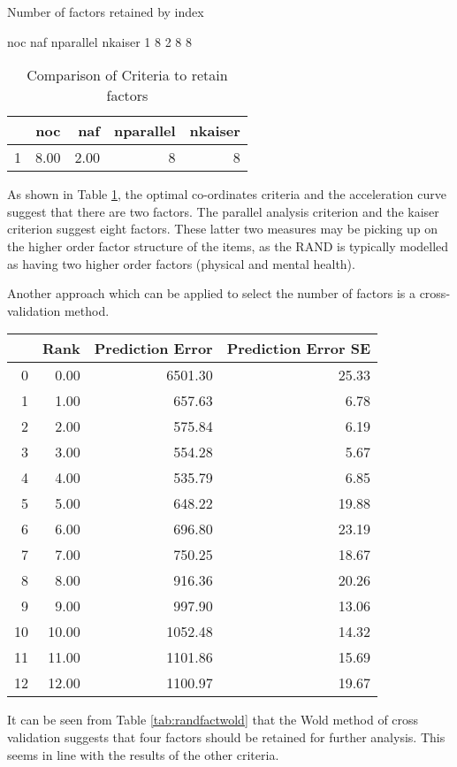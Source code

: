 \documentclass{article}
\begin{document}
 Number of factors retained by index 

  noc naf nparallel nkaiser
1   8   2         8       8
\begin{table}[ht]
\centering
\begin{tabular}{rrrrr}
  \hline
 & noc & naf & nparallel & nkaiser \\ 
  \hline
1 & 8.00 & 2.00 &   8 &   8 \\ 
   \hline
\end{tabular}
\caption{Comparison of Criteria to retain factors} 
\label{tab:randretain}
\end{table}
As shown in Table \ref{tab:randretain}, the optimal co-ordinates criteria and the acceleration curve suggest that there are two factors. 
The parallel analysis criterion and the kaiser criterion suggest eight factors. These latter two measures may be picking up on the higher order factor structure of the items, as the RAND is typically modelled as having two higher order factors (physical and mental health).

Another approach which can be applied to select the number of factors is a cross-validation method.


\begin{table}[ht]
\centering
\begin{tabular}{rrrr}
  \hline
 & Rank & Prediction Error & Prediction Error SE \\ 
  \hline
0 & 0.00 & 6501.30 & 25.33 \\ 
  1 & 1.00 & 657.63 & 6.78 \\ 
  2 & 2.00 & 575.84 & 6.19 \\ 
  3 & 3.00 & 554.28 & 5.67 \\ 
  4 & 4.00 & 535.79 & 6.85 \\ 
  5 & 5.00 & 648.22 & 19.88 \\ 
  6 & 6.00 & 696.80 & 23.19 \\ 
  7 & 7.00 & 750.25 & 18.67 \\ 
  8 & 8.00 & 916.36 & 20.26 \\ 
  9 & 9.00 & 997.90 & 13.06 \\ 
  10 & 10.00 & 1052.48 & 14.32 \\ 
  11 & 11.00 & 1101.86 & 15.69 \\ 
  12 & 12.00 & 1100.97 & 19.67 \\ 
   \hline
\end{tabular}
\end{table}
It can be seen from Table \ref{tab:randfactwold} that the Wold method of cross validation suggests that four factors should be retained for further analysis. This seems in line with the results of the other criteria.
\end{document}
